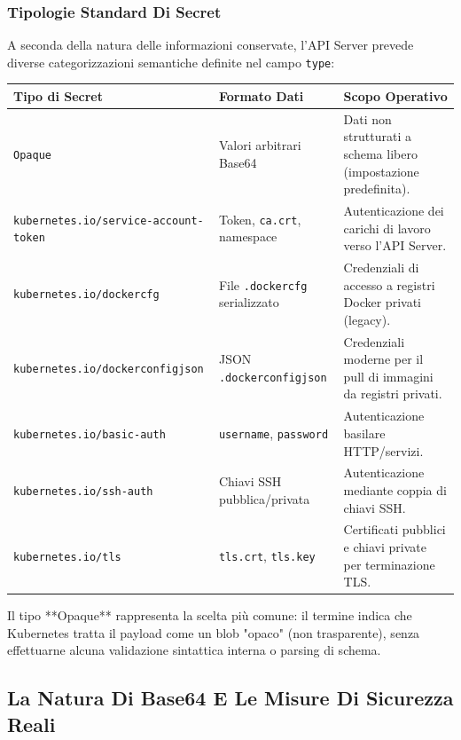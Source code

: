 \documentclass[11pt, a4paper]{article}
\begin{document}
\subsubsection{Tipologie Standard Di Secret}
A seconda della natura delle informazioni conservate, l'API Server prevede diverse categorizzazioni semantiche definite nel campo \texttt{type}:

\begin{center}
\begin{tabularx}{\textwidth}{llX}
    \toprule
    \textbf{Tipo di Secret} & \textbf{Formato Dati} & \textbf{Scopo Operativo} \\
    \midrule
    \texttt{Opaque} & Valori arbitrari Base64 & Dati non strutturati a schema libero (impostazione predefinita). \\
    \addlinespace
    \texttt{kubernetes.io/service-account-token} & Token, \texttt{ca.crt}, namespace & Autenticazione dei carichi di lavoro verso l'API Server. \\
    \addlinespace
    \texttt{kubernetes.io/dockercfg} & File \texttt{.dockercfg} serializzato & Credenziali di accesso a registri Docker privati (legacy). \\
    \addlinespace
    \texttt{kubernetes.io/dockerconfigjson} & JSON \texttt{.dockerconfigjson} & Credenziali moderne per il pull di immagini da registri privati. \\
    \addlinespace
    \texttt{kubernetes.io/basic-auth} & \texttt{username}, \texttt{password} & Autenticazione basilare HTTP/servizi. \\
    \addlinespace
    \texttt{kubernetes.io/ssh-auth} & Chiavi SSH pubblica/privata & Autenticazione mediante coppia di chiavi SSH. \\
    \addlinespace
    \texttt{kubernetes.io/tls} & \texttt{tls.crt}, \texttt{tls.key} & Certificati pubblici e chiavi private per terminazione TLS. \\
    \bottomrule
\end{tabularx}
\end{center}

Il tipo **Opaque** rappresenta la scelta più comune: il termine indica che Kubernetes tratta il payload come un blob "opaco" (non trasparente), senza effettuarne alcuna validazione sintattica interna o parsing di schema.

\subsection{La Natura Di Base64 E Le Misure Di Sicurezza Reali}
\end{document}
